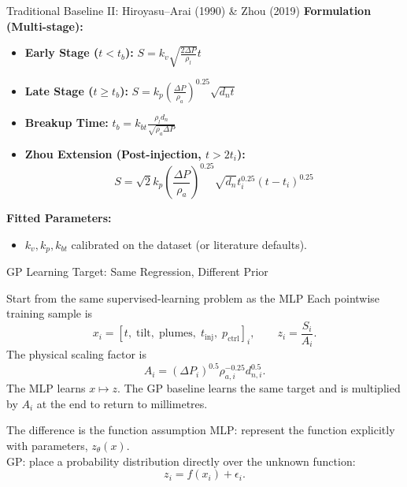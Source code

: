 \documentclass[UTF8,aspectratio=169]{ctexbeamer}
\begin{document}
\begin{frame}{Traditional Baseline II: Hiroyasu--Arai (1990) \& Zhou (2019)}
\textbf{Formulation (Multi-stage):}
\begin{itemize}
    \item \textbf{Early Stage ($t < t_b$):} $S = k_v \sqrt{\frac{2 \Delta P}{\rho_l}} t$
    \item \textbf{Late Stage ($t \geq t_b$):} $S = k_p \left( \frac{\Delta P}{\rho_a} \right)^{0.25} \sqrt{d_n t}$
    \item \textbf{Breakup Time:} $t_b = k_{bt} \frac{\rho_l d_n}{\sqrt{\rho_a \Delta P}}$
    \item \textbf{Zhou Extension (Post-injection, $t > 2t_i$):}
    \[ S = \sqrt{2} k_p \left( \frac{\Delta P}{\rho_a} \right)^{0.25} \sqrt{d_n} t_i^{0.25} (t - t_i)^{0.25} \]
\end{itemize}

\vspace{0.2em}
\textbf{Fitted Parameters:}
\begin{itemize}
    \item $k_v, k_p, k_{bt}$ calibrated on the dataset (or literature defaults).
\end{itemize}
\end{frame}

\begin{frame}{GP Learning Target: Same Regression, Different Prior}
\small
\begin{block}{Start from the same supervised-learning problem as the MLP}
\footnotesize
Each pointwise training sample is
\[
x_i=[t,\;\mathrm{tilt},\;\mathrm{plumes},\;t_{\mathrm{inj}},\;p_{\mathrm{ctrl}}]_i,
\qquad
z_i=\frac{S_i}{A_i}.
\]
The physical scaling factor is
\[
A_i=(\Delta P_i)^{0.5}\rho_{a,i}^{-0.25}d_{n,i}^{0.5}.
\]
The MLP learns \(x\mapsto z\). The GP baseline learns the same target and is
multiplied by \(A_i\) at the end to return to millimetres.
\end{block}

\begin{block}{The difference is the function assumption}
\footnotesize
MLP: represent the function explicitly with parameters, \(z_\theta(x)\).\\
GP: place a probability distribution directly over the unknown function:
\[
z_i=f(x_i)+\epsilon_i.
\]
\end{block}
\end{frame}
\end{document}
